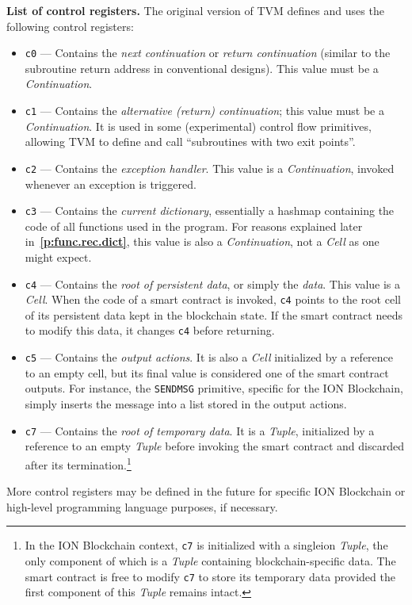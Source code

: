 \documentclass[12pt,oneside]{article}
\def\makepoint#1{\medbreak\noindent{\bf #1.\ }}
\def\nxsubpoint{\refstepcounter{subsubsection}%
  \smallbreak\makepoint{\thesubsubsection}}
\def\refpoint#1{{\rm\textbf{\ref{#1}}}}
\let\ptref=\refpoint
\def\emb#1{\textbf{#1.}}
\begin{document}
\nxsubpoint\label{sp:cr.list}\emb{List of control registers}
The original version of TVM defines and uses the following control registers:
\begin{itemize}
\item \texttt{c0} --- Contains the {\em next continuation} or {\em return continuation} (similar to the subroutine return address in conventional designs). This value must be a {\em Continuation}.
\item \texttt{c1} --- Contains the {\em alternative (return) continuation}; this value must be a {\em Continuation}. It is used in some (experimental) control flow primitives, allowing TVM to define and call ``subroutines with two exit points''.
\item \texttt{c2} --- Contains the {\em exception handler}. This value is a {\em Continuation},  invoked whenever an exception is triggered.
\item \texttt{c3} --- Contains the {\em current dictionary}, essentially a hashmap containing the code of all functions used in the program. For reasons explained later in~\ptref{p:func.rec.dict}, this value is also a {\em Continuation}, not a {\em Cell\/} as one might expect.
\item \texttt{c4} --- Contains the {\em root of persistent data}, or simply the {\em data}. This value is a {\em Cell}. When the code of a smart contract is invoked, \texttt{c4} points to the root cell of its persistent data kept in the blockchain state. If the smart contract needs to modify this data, it changes \texttt{c4} before returning.
\item \texttt{c5} --- Contains the {\em output actions}. It is also a {\em Cell\/} initialized by a reference to an empty cell, but its final value is considered one of the smart contract outputs. For instance, the {\tt SENDMSG} primitive, specific for the ION Blockchain, simply inserts the message into a list stored in the output actions.
\item \texttt{c7} --- Contains the {\em root of temporary data}. It is a {\em Tuple}, initialized by a reference to an empty {\em Tuple\/} before invoking the smart contract and discarded after its termination.\footnote{In the ION Blockchain context, \texttt{c7} is initialized with a singleion {\em Tuple}, the only component of which is a {\em Tuple\/} containing blockchain-specific data. The smart contract is free to modify \texttt{c7} to store its temporary data provided the first component of this {\em Tuple\/} remains intact.}
\end{itemize}
More control registers may be defined in the future for specific ION Block\-chain or high-level programming language purposes, if necessary.
\end{document}
